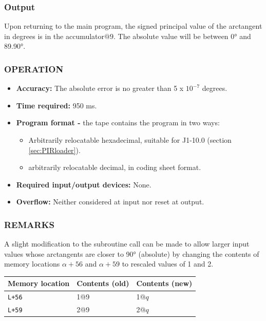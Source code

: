 \documentclass{article}
\begin{document}
\subsubsection*{Output}
Upon returning to the main program, the signed principal value of the arctangent in degrees is in the accumulator$@9$. The absolute value will be between 0° and 89.90°.

\subsubsection*{OPERATION}
\begin{itemize}
    \item \textbf{Accuracy:} The absolute error is no greater than 5 x $10^{-7}$ degrees.
    \item \textbf{Time required:} 950 ms.
    \item \textbf{Program format -} the tape contains the program in two ways:
    \begin{itemize}
      \item Arbitrarily relocatable hexadecimal, suitable for J1-10.0 (section \ref{sec:PIRloader}).
        \item arbitrarily relocatable decimal, in coding sheet format.
    \end{itemize}
    \item \textbf{Required input/output devices:} None.
    \item \textbf{Overflow:} Neither considered at input nor reset at output.
\end{itemize}

\subsubsection*{REMARKS}
A slight modification to the subroutine call can be made to allow larger input values whose arctangents are closer to 90° (absolute) by changing the contents of memory locations $\alpha+56$ and $\alpha+59$ to rescaled values of 1 and 2.

\begin{center}
\begin{tabular}{lll}
    \toprule
    Memory location & Contents (old) & Contents (new) \\
    \midrule
    \texttt{L+56} & 1@9 & 1@$q$ \\
    \texttt{L+59} & 2@9 & 2@$q$ \\
    \bottomrule
\end{tabular}
\end{center}
\end{document}
